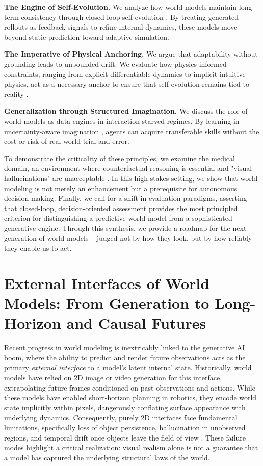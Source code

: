 \documentclass[pdflatex,sn-mathphys-num]{sn-jnl}
\theoremstyle{thmstyleone}%
\theoremstyle{thmstyletwo}%
\theoremstyle{thmstylethree}%
\begin{document}
\textbf{The Engine of Self-Evolution.} We analyze how world models maintain long-term consistency through closed-loop self-evolution \citep{wang2023robogen, genrl}. By treating generated rollouts as feedback signals to refine internal dynamics, these models move beyond static prediction toward adaptive simulation.

\textbf{The Imperative of Physical Anchoring.} We argue that adaptability without grounding leads to unbounded drift. We evaluate how physics-informed constraints, ranging from explicit differentiable dynamics to implicit intuitive physics, act as a necessary anchor to ensure that self-evolution remains tied to reality \citep{li2025pin, garrido2025intuitive}.

\textbf{Generalization through Structured Imagination.} We discuss the role of world models as data engines in interaction-starved regimes. By learning in uncertainty-aware imagination \citep{whale, diwa}, agents can acquire transferable skills without the cost or risk of real-world trial-and-error.

To demonstrate the criticality of these principles, we examine the medical domain, an environment where counterfactual reasoning is essential and "visual hallucinations" are unacceptable \citep{mewm}. In this high-stakes setting, we show that world modeling is not merely an enhancement but a prerequisite for autonomous decision-making. Finally, we call for a shift in evaluation paradigms, asserting that closed-loop, decision-oriented assessment provides the most principled criterion for distinguishing a predictive world model from a sophisticated generative engine. Through this synthesis, we provide a roadmap for the next generation of world models -- judged not by how they look, but by how reliably they enable us to act.





\section{External Interfaces of World Models: From Generation to Long-Horizon and Causal Futures}

Recent progress in world modeling is inextricably linked to the generative AI boom, where the ability to predict and render future observations acts as the primary \emph{external interface} to a model's latent internal state. Historically, world models have relied on 2D image or video generation for this interface, extrapolating future frames conditioned on past observations and actions. While these models have enabled short-horizon planning in robotics, they encode world state implicitly within pixels, dangerously conflating surface appearance with underlying dynamics. Consequently, purely 2D interfaces face fundamental limitations, specifically loss of object persistence, hallucination in unobserved regions, and temporal drift once objects leave the field of view \citep{zhou2025learning}. These failure modes highlight a critical realization: visual realism alone is not a guarantee that a model has captured the underlying structural laws of the world.
\end{document}
